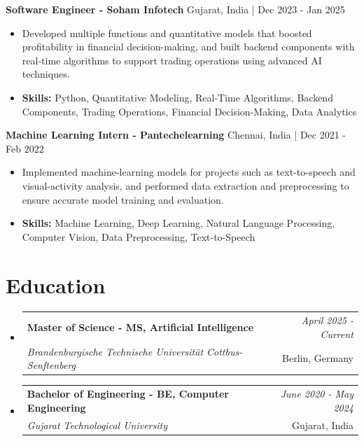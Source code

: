 \documentclass[a4paper,11pt]{article}
\makeatletter
\newcommand{\resumeSubheading}[4]{
\vspace{0.5mm}\item
    \begin{tabular*}{\linewidth}[t]{l@{\extracolsep{\fill}}r}
        \textbf{#1} & \textit{\footnotesize{#4}} \\
        \textit{\footnotesize{#3}} &  \footnotesize{#2}\\
    \end{tabular*}
    \vspace{-2.4mm}
}
\makeatother
\begin{document}
\vspace{1mm}
  \textbf{Software Engineer - Soham Infotech} \hfill Gujarat, India | Dec 2023 - Jan 2025
\vspace{-1.5mm} %
\begin{itemize}
  \item Developed multiple functions and quantitative models that boosted profitability in financial decision-making, and built backend components with real-time algorithms to support trading operations using advanced AI techniques.

\vspace{-2mm}
  \item \textbf{Skills:} Python, Quantitative Modeling, Real-Time Algorithms, Backend Components, Trading Operations, Financial Decision-Making, Data Analytics
\end{itemize}

\vspace{1mm}
  \textbf{Machine Learning Intern - Pantechelearning} \hfill Chennai, India | Dec 2021 - Feb 2022
\vspace{-1.5mm} %
\begin{itemize}
  \item Implemented machine-learning models for projects such as text-to-speech and visual-activity analysis, and performed data extraction and preprocessing to ensure accurate model training and evaluation.
\vspace{-2mm}
  \item \textbf{Skills:} Machine Learning, Deep Learning, Natural Language Processing, Computer Vision, Data Preprocessing, Text-to-Speech
\end{itemize}\section{\textbf{Education}}
\vspace{-0.4mm}

\begin{itemize}[leftmargin=0.15in, label={}]
\resumeSubheading
{Master of Science - MS, Artificial Intelligence }{Berlin, Germany}
{Brandenburgische Technische Universität Cottbus-Senftenberg  }{April 2025 - Current}

\vspace{1.0mm} %
\resumeSubheading
{Bachelor of Engineering - BE, Computer Engineering  }{Gujarat, India}
{Gujarat Technological University }{June 2020 - May 2024}

\end{itemize}
\end{document}
